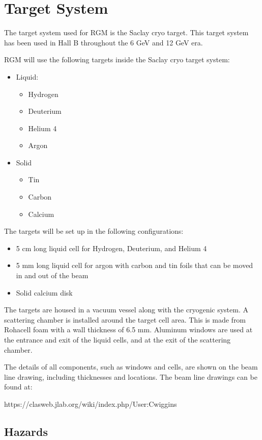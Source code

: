 \section{Target System}

The target system used for RGM is the Saclay cryo target.  This target system has been used in Hall B throughout the 6 GeV and 12 GeV era.

RGM will use the following targets inside the Saclay cryo target system:
\begin{itemize}
\item	Liquid:
   \begin{itemize}
	\item	Hydrogen
	\item		Deuterium
	\item		Helium 4
	\item		Argon
    \end{itemize}
\item		Solid
   \begin{itemize}
	\item		Tin
	\item		Carbon
	\item		Calcium
   \end{itemize}
\end{itemize}
	
The targets will be set up in the following configurations:
\begin{itemize}
\item		5 cm long liquid cell for Hydrogen, Deuterium, and Helium 4
\item		5 mm long liquid cell for argon with carbon and tin foils that can be moved in and out of the beam
\item		Solid calcium disk
\end{itemize}

The targets are housed in a vacuum vessel along with the cryogenic system.  A scattering chamber is installed around the target cell area.  This is made from Rohacell foam with a wall thickness of 6.5 mm.  Aluminum windows are used at the entrance and exit of the liquid cells, and at the exit of the scattering chamber.

The details of all components, such as windows and cells, are shown on the beam line drawing, including thicknesses and locations.  The beam line drawings can be found at:

https://clasweb.jlab.org/wiki/index.php/User:Cwiggins
               
\subsection{Hazards} 

